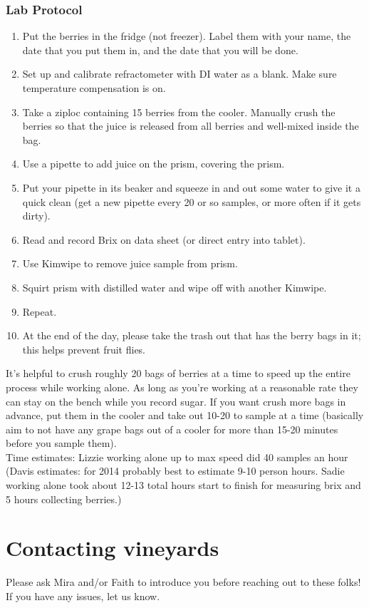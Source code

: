 \documentclass[11pt,letter]{article}
\begin{document}
\subsubsection{Lab Protocol}
\begin{enumerate}
\item Put the berries in the fridge (not freezer). Label them with your name, the date that you put them in, and the date that you will be done.
\item Set up and calibrate refractometer with DI water as a blank. Make sure temperature compensation is on. 
\item Take a ziploc containing 15 berries from the cooler. Manually crush the berries so that the juice is released from all berries and well-mixed inside the bag. 
\item Use a pipette to add juice on the prism, covering the prism. %
\item Put your pipette in its beaker and squeeze in and out some water to give it a quick clean (get a new pipette every 20 or so samples, or more often if it gets dirty). 
\item Read and record Brix on data sheet (or direct entry into tablet).   
\item Use Kimwipe to remove juice sample from prism. 
\item Squirt prism with distilled water and wipe off with another Kimwipe. 
\item Repeat. 
\item At the end of the day, please take the trash out that has the berry bags in it; this helps prevent fruit flies.
\end{enumerate}

It’s helpful to crush roughly 20 bags of berries at a time to speed up the entire process while working alone. As long as you're working at a reasonable rate they can stay on the bench while you record sugar. If you want crush more bags in advance, put them in the cooler and take out 10-20 to sample at a time (basically aim to not have any grape bags out of a cooler for more than 15-20 minutes before you sample them).\\

Time estimates: Lizzie working alone up to max speed did 40 samples an hour (Davis estimates: for 2014 probably best to estimate 9-10 person hours. Sadie working alone took about 12-13 total hours start to finish for measuring brix and 5 hours collecting berries.)

\section{Contacting vineyards}
Please ask Mira and/or Faith to introduce you before reaching out to these folks! If you have any issues, let us know.\\
\end{document}
